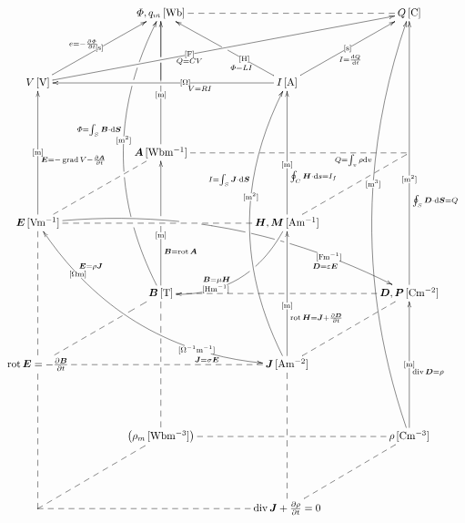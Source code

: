 \documentclass[a4j,10pt]{jarticle}
\makeatletter
\def\uni#1{[\!\unit{#1}]}
\def\cell#1#2{#1\,\uni{#2}}
\def\dottedhole#1{\ar@{--}[#1]|!{[ld];[lu]}\hole}
\def\dottedholea#1{\ar@{--}[#1]|!{[ld];[lu]}\hole |!{+(-9.5,-10);+(-9.5,10)}\hole }
\def\dotted#1{\ar@{--}[#1]}
\def\dotteda#1{\ar@{--}[#1] |!{+(11.5,-50);+(11.5,50)}\hole}
\def\arr#1#2#3#4#5{\ar[#1] |-(#2){\uni{#3}} _(#4){#5}}
\def\arruu#1#2#3#4{\arr{uu}{#1}{#2}{#3}{#4}}
\def\arruubefore#1{\arruu{0.4}{m}{0.33}{#1}}
\def\arruubeforemiddlehole{\arruubefore{}|-(0.5)\hole}
\def\arruumiddle#1{\arruu{0.5}{m}{0.45}{#1}}
\def\arrbeforeafter#1#2#3{\arr{#1}{0.4}{#2}{0.40}{#3}}
\def\arrmiddle#1#2#3{\arr{#1}{0.5}{#2}{0.45}{#3}}
\def\arruuuu#1#2#3#4{\arr{uuuu}{#1}{#2}{#3}{#4}}
\def\arruuuubefore#1{\arruuuu{0.4}{m^2}{0.33}{#1}}
\def\arrup#1#2#3#4#5{\ar[#1] |-(#2){\uni{#3}}^(#4){#5}}
\def\arrupbeforebeforebefore#1#2#3{\arrup{#1}{0.3}{#2}{0.3}{#3}}
\def\arrupmiddle#1#2#3{\arrup{#1}{0.5}{#2}{0.45}{#3}}
\def\arrupbeforebefore#1#2#3{\arrup{#1}{0.4}{#2}{0.35}{#3}}
\def\arrcv#1#2#3#4#5{\ar@/^3pc/[#1]|-(#2){\uni{#3}}^(#4){#5}}
\def\arrcvafter#1#2#3{\arrcv{#1}{0.6}{#2}{0.65}{#3}}
\def\arrowyyy#1#2#3{\ar@/^3pc/[#1] |-(0.23)\hole |-(.25)\hole |-(0.26){} |-(0.42)\hole|-(.55){\uni{#2}}^(.58){#3}|!{[luuu];[uuur]}\hole  |-(.768)\hole |-(.78){} |-(.836)\hole}
\def\arrowyy#1#2#3#4#5{\ar@/_3pc/@{<->}[#1]|-(0.2){\uni{#4}}^(0.2){#5}|-(.75){\uni{#2}}_(.75){#3}}
\def\arrowz#1#2#3{\ar@/^2pc/[#1] |!{+(-10,-10);+(-10,10)}\hole|-(.7){\uni{#2}}_(.6){#3}}
\def\arrowzz#1#2#3{\ar@/^2.4pc/[#1] |-(.35)\hole |-(.38)\hole |-(.40)\hole |-(.44){} |-(.55)\hole |-(.64)\hole |-(.65){} |!{[rr];[rrdd]}\hole |-(.8){\uni{#2}}_(.8){#3\quad}}
\newcommand{\A}{\bm A}
\newcommand{\B}{\bm B}
\newcommand{\D}{\bm D}
\newcommand{\E}{\bm E}
\newcommand{\J}{\bm J}
\newcommand{\M}{\bm M}
\newcommand{\bmP}{\bm P}
\makeatother
\begin{document}
\begin{center}
\[\xymatrix@=0.70in{
  & \cell{\varPhi, q_m}{Wb}\dotted{rr}\ar@{-}[d]|!{[ld];[rr]}\hole & & \cell{Q}{C}\\
  \cell V V\arrupmiddle{ur}{s}{e=-\fracpd\varPhi t}\arrbeforeafter{rrru}{F}{Q=CV} & & \cell I A\arrupbeforebefore{ll}{O}{V=RI}\arrmiddle{ur}{s}{I=\diff Q t}\arrupbeforebeforebefore{lu}{H}{\varPhi=LI}|-(0.5)\hole & \\
  & \cell{\A}{Wbm^{-1}} \arruubeforemiddlehole|!{[lu];[ruru]}\hole & *=0{} & \dottedholea{ll}\dotted{ld}\\
  \cell{\E}{Vm^{-1}}\arruumiddle{\E=-\grad V-\frac{\partial\A}{\partial t}}\dotted{rr} |!{+(20,-10);+(20,10)}\hole |!{+(32.5,-10);+(32.5,10)}\hole \dotted{ru}\arrowzz{rrrd}{Fm^{-1}}{\D=\varepsilon\E}\arrowyy{rrdd}{O^{-1}m^{-1}}{\J=\sigma\E}{Om}{\E=\rho\J } & & \cell{\bm H,\M}{Am^{-1}}\arruubefore{\oint_C\bm H\cdot\dd s=I_f}\arrowz{dl}{Hm^{-1}}{\B=\mu\bm H} & \\
  & \cell{\B}{T}\arruubeforemiddlehole_(.3){\B=\rot \A}|-(.52)\hole |-(.55)\hole |-(.56){} \arrowyyy{uuuu}{m^2}{\varPhi=\int_S\B\cdot\dd\bm S} & & \cell{\D,\bmP}{Cm^{-2}}\arruuuubefore{\oint_S\D\cdot\dd\bm{S}=Q}\dottedhole{ll}\dotted{ld}\\
  {\rot\E=-\frac{\partial\B}{\partial t}}\dotted{uu}\dotted{rr}\dotteda{ru} & & \cell{\J}{Am^{-2}}\arruubefore{\rot\bm H=\J +\frac{\partial\D}{\partial t}}\arrcvafter{uuuu}{m^2}{I=\int_S\J\cdot\dd\bm S}\\
  & \left(\cell{\rho_m}{Wbm^{-3}}\right)\ar@{--}[uu]|!{[u];[u]}\hole |-(.73)\hole & & \cell{\rho}{Cm^{-3}}\arruumiddle{\diver\D=\rho}\arrcvafter{uuuuuu}{m^3}{Q=\int_v\rho\dd v}\dottedhole{ll}\dotted{ld}\\
  *=0{} \dotted{uu}\dotted{rr}\dotted{ru} & & \diver\J +\frac{\partial\rho}{\partial t}=0\dotted{uu} |!{+(-10,-10);(10,-10)}\hole & \\
}\]


\end{center}
\end{document}
